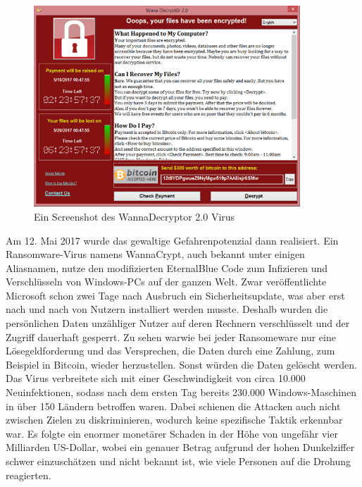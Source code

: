 \documentclass[DIV=12,headings=normal,pdftex,headinclude=false,footinclude=false,final]{scrreprt}
\begin{document}
\begin{figure}[H]
    \centering
    \includegraphics[width=10cm]{wanna_decrypt0r_2.0.png}
    \caption[WannaDecryptor Screenshot, URL: <https://securelist.com/   wannacry-ransomware-used-in-widespread-attacks-all-over-the-world/78351/>]{Ein Screenshot des  WannaDecryptor 2.0 Virus}
    \label{img:wanna_decrypt0r}
\end{figure}

\noindent
Am 12. Mai 2017 wurde das gewaltige Gefahrenpotenzial dann realisiert. Ein Ransomware-Virus namens WannaCrypt, auch bekannt unter einigen Aliasnamen, nutze den modifizierten EternalBlue Code zum Infizieren und Verschlüsseln von Windows-PCs auf der ganzen Welt\cite{Avast}. Zwar veröffentlichte Microsoft schon zwei Tage nach Ausbruch ein Sicherheitsupdate, was aber erst nach und nach von Nutzern installiert werden musste\cite{MSSB}. Deshalb wurden die persönlichen Daten unzähliger Nutzer auf deren Rechnern verschlüsselt und der Zugriff dauerhaft gesperrt. Zu sehen warwie bei jeder Ransomeware nur eine Lösegeldforderung und das Versprechen, die Daten durch eine Zahlung, zum Beispiel in Bitcoin, wieder herzustellen. Sonst würden die Daten gelöscht werden. Das Virus verbreitete sich mit einer Geschwindigkeit von circa 10.000 Neuinfektionen, sodass nach dem ersten Tag bereits 230.000 Windows-Maschinen in über 150 Ländern betroffen waren. Dabei schienen die Attacken auch nicht zwischen Zielen zu diskriminieren, wodurch keine spezifische Taktik erkennbar war. Es folgte ein enormer monetärer Schaden in der Höhe von ungefähr vier Milliarden US-Dollar, wobei ein genauer Betrag aufgrund der hohen Dunkelziffer schwer einzuschätzen und nicht bekannt ist, wie viele Personen auf die Drohung reagierten\cite{Avast}.
\end{document}
